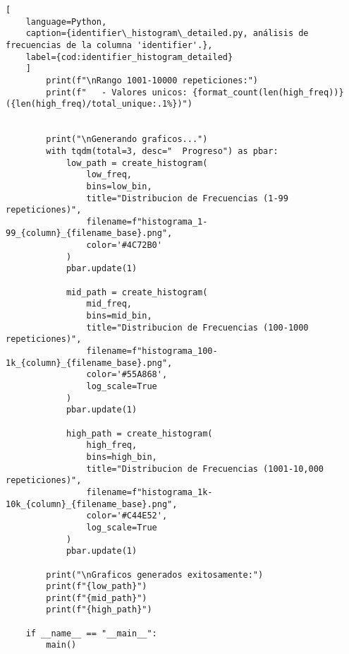 \begin{lstlisting}[
    language=Python,
    caption={identifier\_histogram\_detailed.py, análisis de frecuencias de la columna 'identifier'.},
    label={cod:identifier_histogram_detailed}
    ]
        print(f"\nRango 1001-10000 repeticiones:")
        print(f"   - Valores unicos: {format_count(len(high_freq))} ({len(high_freq)/total_unique:.1%})")
    

        print("\nGenerando graficos...")
        with tqdm(total=3, desc="  Progreso") as pbar:
            low_path = create_histogram(
                low_freq, 
                bins=low_bin,
                title="Distribucion de Frecuencias (1-99 repeticiones)",
                filename=f"histograma_1-99_{column}_{filename_base}.png",
                color='#4C72B0'
            )
            pbar.update(1)
            
            mid_path = create_histogram(
                mid_freq,
                bins=mid_bin,
                title="Distribucion de Frecuencias (100-1000 repeticiones)",
                filename=f"histograma_100-1k_{column}_{filename_base}.png",
                color='#55A868',
                log_scale=True
            )
            pbar.update(1)
            
            high_path = create_histogram(
                high_freq,
                bins=high_bin,
                title="Distribucion de Frecuencias (1001-10,000 repeticiones)",
                filename=f"histograma_1k-10k_{column}_{filename_base}.png",
                color='#C44E52',
                log_scale=True
            )
            pbar.update(1)
        
        print("\nGraficos generados exitosamente:")
        print(f"{low_path}")
        print(f"{mid_path}")
        print(f"{high_path}")

    if __name__ == "__main__":
        main()
\end{lstlisting}
\vfill